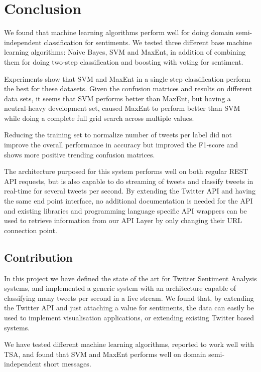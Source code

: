 \chapter{Conclusion}

We found that machine learning algorithms perform well for doing domain semi-independent classification for sentiments. We tested three different base machine learning algorithms: Naive Bayes, SVM and MaxEnt, in addition of combining them for doing two-step classification and boosting with voting for sentiment. 

Experiments show that SVM and MaxEnt in a single step classification perform the best for these datasets. Given the confusion matrices and results on different data sets, it seems that SVM performs better than MaxEnt, but having a neutral-heavy development set, caused MaxEnt to perform better than SVM while doing a complete full grid search across multiple values.

Reducing the training set to normalize number of tweets per label did not improve the overall performance in accuracy but improved the F1-score and shows more positive trending confusion matrices. 

The architecture purposed for this system performs well on both regular REST API requests, but is also capable to do streaming of tweets and classify tweets in real-time for several tweets per second. By extending the Twitter API and having the same end point interface, no additional documentation is needed for the API and existing libraries and programming language specific API wrappers can be used to retrieve information from our API Layer by only changing their URL connection point. 

\section{Contribution}

In this project we have defined the state of the art for Twitter Sentiment Analysis systems, and implemented a generic system with an architecture capable of classifying many tweets per second in a live stream. We found that, by extending the Twitter API and just attaching a value for sentiments, the data can easily be used to implement visualisation applications, or extending existing Twitter based systems. 

We have tested different machine learning algorithms, reported to work well with TSA, and found that SVM and MaxEnt performs well on domain semi-independent short messages. 

